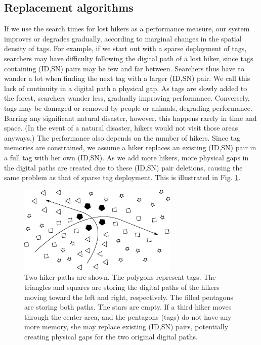 \documentclass[conference]{IEEEtran}
\begin{document}
\subsection{Replacement algorithms}
If we use the search times for lost hikers as a performance measure, our system improves or degrades gradually, according to marginal changes in the spatial density of tags.  For example, if we start out with a sparse deployment of tags, searchers may have difficulty following the digital path of a lost hiker, since tags containing (ID,SN) pairs may be few and far between.  Searchers thus have to wander a lot when finding the next tag with a larger (ID,SN) pair.  We call this lack of continuity in a digital path a physical gap.  As tags are slowly added to the forest, searchers wander less, gradually improving performance.  Conversely, tags may be damaged or removed by people or animals, degrading performance.  Barring any significant natural disaster, however, this happens rarely in time and space.  (In the event of a natural disaster, hikers would not visit those areas anyways.)  The performance also depends on the number of hikers.  Since tag memories are constrained, we assume a hiker replaces an existing (ID,SN) pair in a full tag with her own (ID,SN).  As we add more hikers, more physical gaps in the digital paths are created due to these (ID,SN) pair deletions, causing the same problem as that of sparse tag deployment.  This is illustrated in Fig. \ref{fig:system2}. 

\begin{figure}
\centering
\includegraphics[width=3in]{system2.eps}
\caption{Two hiker paths are shown.  The polygons represent tags.  The triangles and squares are storing the digital paths of the hikers moving toward the left and right, respectively.  The filled pentagons are storing both paths.  The stars are empty.  If a third hiker moves through the center area, and the pentagons (tags) do not have any more memory, she may replace existing (ID,SN) pairs, potentially creating physical gaps for the two original digital paths.\label{fig:system2}}
\end{figure}
\end{document}
